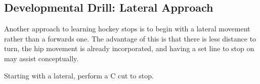 \subsection*{Developmental Drill: Lateral Approach} 

Another approach to learning hockey stops is to begin with a lateral movement rather than a forwards one.    
The advantage of this is that there is less distance to turn, the hip movement is already incorporated, and having a set line to stop on may assist conceptually.   


Starting with a lateral, perform a C cut to stop. 


